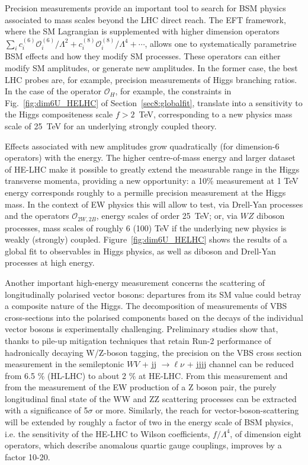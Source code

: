 \documentclass[../report.tex]{subfiles}
\begin{document}
Precision measurements provide an important tool to search for BSM physics associated to mass scales beyond the LHC direct reach. The EFT framework, where the SM Lagrangian is supplemented with higher dimension operators $\sum_{i} c_i^{(6)}\mathcal{O}^{(6)}_i/\Lambda^2+c_i^{(8)}\mathcal{O}^{(8)}_i/\Lambda^4+\cdots$, allows one to systematically parametrise BSM effects and how they modify SM processes. These operators can either modify SM amplitudes, or generate new amplitudes. In the former case, the best LHC probes are, for example, precision measurements of Higgs branching ratios. In the case of the operator $\mathcal{O}_H$, for example, the constraints in Fig.~\ref{fig:dim6U_HELHC} of Section~\ref{sec8:globalfit}, translate into a sensitivity to the Higgs compositeness scale $f>2$~TeV, corresponding to a new physics mass scale of 25~TeV for an underlying strongly coupled theory.

Effects associated with  new amplitudes grow quadratically (for dimension-6 operators) with the energy. The higher centre-of-mass energy and larger dataset of HE-LHC make it possible to greatly extend the measurable range in the Higgs transverse momenta, providing a new opportunity: a 10\% measurement  at 1 TeV energy corresponds roughly to a permille  precision measurement at the Higgs mass. 
In the context of EW physics this will allow  to test, via Drell-Yan processes and  the operators $\mathcal{O}_{2W,2B}$, energy scales of order 25~TeV; or, via $WZ$ diboson processes, mass scales of roughly 6 (100) TeV if the underlying new physics is weakly (strongly) coupled.
Figure~\ref{fig:dim6U_HELHC} shows the results of a global fit  to observables in Higgs physics, as well as diboson and Drell-Yan processes at high energy. 

Another important high-energy measurement concerns the scattering of longitudinally polarised vector bosons: departures from its SM value could betray a composite nature of the Higgs.
The decomposition of measurements of VBS cross-sections into the polarised components based on the decays of the individual vector bosons is experimentally challenging. Preliminary studies show that, thanks to pile-up mitigation techniques that retain Run-2 performance of hadronically decaying W/Z-boson tagging, the precision on the VBS cross section measurement in the semileptonic $W V$ + jj $\to \ell\nu$ + jjjj channel can be reduced from 6.5 $\%$ (HL-LHC) to about 2 $\%$ at HE-LHC. From this measurement and from the measurement of the EW production of a Z boson pair, the purely longitudinal final state of the WW and ZZ scattering processes can be extracted with a significance of 5$\sigma$ or more. Similarly, the reach for vector-boson-scattering will be extended by roughly a factor of two in the energy scale of BSM physics, i.e. the sensitivity of the HE-LHC to Wilson coefficients, $f/\Lambda^4$, of dimension eight operators, which describe anomalous quartic gauge couplings, improves by a factor 10-20.
\end{document}
